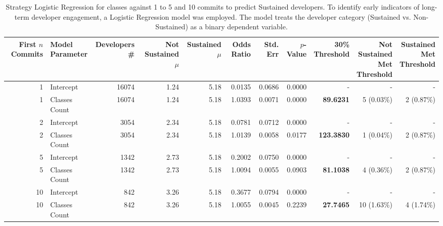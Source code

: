 \begin{landscape}
\begin{table}[H]
\centering
\setlength{\tabcolsep}{2pt}
\caption[Strategy Logistic Regression Sustained for classes for 1 to 5 and 10]{Strategy Logistic Regression for classes against 1 to 5 and 10 commits to predict Sustained developers. 
    To identify early indicators of long-term developer engagement, a Logistic Regression model was employed. The model treats the developer category (Sustained vs. Non-Sustained) as a binary dependent variable. }
\begin{tabular}{r l r r r r r r r r r}
\toprule
\makecell[t]{\textbf{First $n$}\\\textbf{Commits}} & \makecell[t]{\textbf{Model}\\\textbf{Parameter}} & \makecell[t]{\textbf{Developers}\\\textbf{\#}} & \makecell[t]{\textbf{Not}\\\textbf{Sustained}\\\textbf{$\mu$}} & \makecell[t]{\textbf{Sustained}\\\textbf{$\mu$}} & \textbf{Odds Ratio} & \textbf{Std. Err} & \textbf{$p$-Value} & \makecell[t]{\textbf{30\%}\\\textbf{Threshold}} & \makecell[t]{\textbf{Not}\\\textbf{Sustained}\\\textbf{Met}\\\textbf{Threshold}} & \makecell[t]{\textbf{Sustained}\\\textbf{Met}\\\textbf{Threshold}} \\ 
\midrule
1 & Intercept & 16074 & 1.24 & 5.18 & 0.0135 & 0.0686 & 0.0000 & - & - & - \\ 
1 & Classes Count & 16074 & 1.24 & 5.18 & 1.0393 & 0.0071 & 0.0000 & \textbf{89.6231} & 5 (0.03\%) & 2 (0.87\%) \\ 
2 & Intercept & 3054 & 2.34 & 5.18 & 0.0781 & 0.0712 & 0.0000 & - & - & - \\ 
2 & Classes Count & 3054 & 2.34 & 5.18 & 1.0139 & 0.0058 & 0.0177 & \textbf{123.3830} & 1 (0.04\%) & 2 (0.87\%) \\ 
5 & Intercept & 1342 & 2.73 & 5.18 & 0.2002 & 0.0750 & 0.0000 & - & - & - \\ 
5 & Classes Count & 1342 & 2.73 & 5.18 & 1.0094 & 0.0055 & 0.0903 & \textbf{81.1038} & 4 (0.36\%) & 2 (0.87\%) \\ 
10 & Intercept & 842 & 3.26 & 5.18 & 0.3677 & 0.0794 & 0.0000 & - & - & - \\ 
10 & Classes Count & 842 & 3.26 & 5.18 & 1.0055 & 0.0045 & 0.2239 & \textbf{27.7465} & 10 (1.63\%) & 4 (1.74\%) \\ 
\end{tabular}%
\label{tab:codebase_graph_latex_repository_graph_component_time_series_strategy_logistic_regressionSustained_True_classes_20} 
\end{table}
\end{landscape}
\newpage 

 \newpage 
